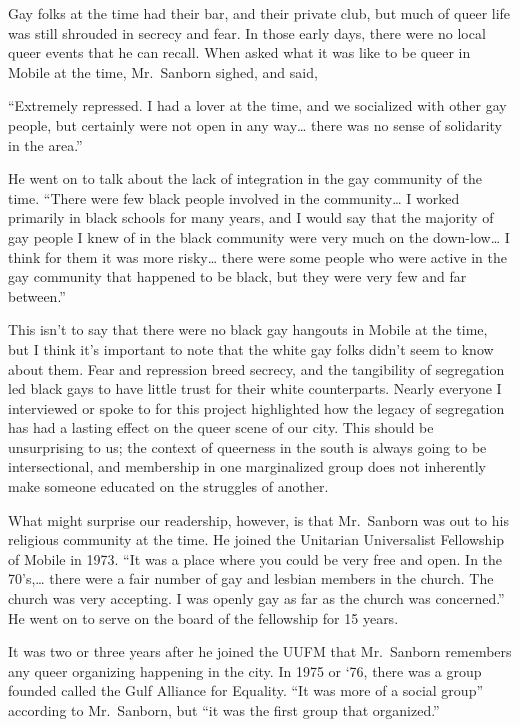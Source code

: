 \documentclass[
]{book}
\begin{document}
Gay folks at the time had their bar, and their private club, but much of queer life was still shrouded in secrecy and fear. In those early days, there were no local queer events that he can recall. When asked what it was like to be queer in Mobile at the time, Mr.~Sanborn sighed, and said,

``Extremely repressed. I had a lover at the time, and we socialized with other gay people, but certainly were not open in any way\ldots{} there was no sense of solidarity in the area.''

He went on to talk about the lack of integration in the gay community of the time. ``There were few black people involved in the community\ldots{} I worked primarily in black schools for many years, and I would say that the majority of gay people I knew of in the black community were very much on the down-low\ldots{} I think for them it was more risky\ldots{} there were some people who were active in the gay community that happened to be black, but they were very few and far between.''

This isn't to say that there were no black gay hangouts in Mobile at the time, but I think it's important to note that the white gay folks didn't seem to know about them. Fear and repression breed secrecy, and the tangibility of segregation led black gays to have little trust for their white counterparts. Nearly everyone I interviewed or spoke to for this project highlighted how the legacy of segregation has had a lasting effect on the queer scene of our city. This should be unsurprising to us; the context of queerness in the south is always going to be intersectional, and membership in one marginalized group does not inherently make someone educated on the struggles of another.

What might surprise our readership, however, is that Mr.~Sanborn was out to his religious community at the time. He joined the Unitarian Universalist Fellowship of Mobile in 1973. ``It was a place where you could be very free and open. In the 70's,\ldots{} there were a fair number of gay and lesbian members in the church. The church was very accepting. I was openly gay as far as the church was concerned.'' He went on to serve on the board of the fellowship for 15 years.

It was two or three years after he joined the UUFM that Mr.~Sanborn remembers any queer organizing happening in the city. In 1975 or `76, there was a group founded called the Gulf Alliance for Equality. ``It was more of a social group'' according to Mr.~Sanborn, but ``it was the first group that organized.''
\end{document}
